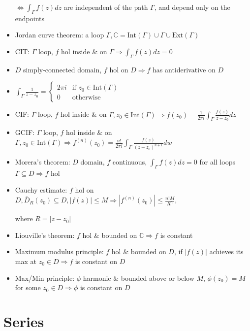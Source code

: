 \documentclass[10pt,a4paper]{article}
\begin{document}
\begin{multicols}{2}
\begin{itemize}
      $\Leftrightarrow \int_\Gamma f(z)dz$ are independent of the path $\Gamma$, and depend only on the endpoints
    \item Jordan curve theorem: a loop $\Gamma, \mathbb C= \text{Int}(\Gamma) \cup \Gamma \cup \text{Ext}(\Gamma)$
    \item CIT: $\Gamma$ loop, $f$ hol inside \& on $\Gamma \Rightarrow \int_\Gamma f(z)dz=0$
    \item $D$ simply-connected domain, $f$ hol on $D \Rightarrow f$ has antiderivative on $D$
    \item $\displaystyle \int_\Gamma \frac{1}{z-z_0}= \begin{cases} 2\pi i & \text{if } z_0 \in \text{Int}(\Gamma) \\ 0 & \text{otherwise}\end{cases}$
    \item CIF: $\Gamma$ loop, $f$ hol inside \& on $\displaystyle \Gamma, z_0 \in \text{Int}(\Gamma) \Rightarrow f(z_0)=\frac{1}{2\pi i} \int_\Gamma \frac{f(z)}{z-z_0}dz$
   
    \item GCIF: $\Gamma$ loop, $f$ hol inside \& on $\displaystyle \Gamma, z_0 \in \text{Int}(\Gamma) \Rightarrow f^{(n)}(z_0)= \frac{n!}{2\pi i}\int_\Gamma \frac{f(z)}{(z-z_0)^{n+1}}dw$

    \item Morera's theorem: $D$ domain, $f$ continuous, $\int_\Gamma f(z)dz=0$ for all loops $\Gamma \subseteq D \Rightarrow f$ hol
    \item Cauchy estimate: $f$ hol on $\displaystyle D, \bar D_R(z_0) \subseteq D, |f(z)| \leq M \Rightarrow |f^{(n)}(z_0)| \leq \frac{n!M}{R^n}$, 
    
    where $R=|z-z_0|$
    \item Liouville's theorem: $f$ hol \& bounded on $\mathbb C \Rightarrow f$ is constant
    \item Maximum modulus principle: $f$ hol \& bounded on $D$, if $|f(z)|$ achieves its max at $z_0 \in D \Rightarrow f$ is constant on $D$ 
    \item Max/Min principle: $\phi$ harmonic \& bounded above or below $M$, $\phi(z_0)=M$ for some $z_0\in D \Rightarrow \phi$ is constant on $D$
\end{itemize}

\section{Series}


\end{multicols}
\end{document}
